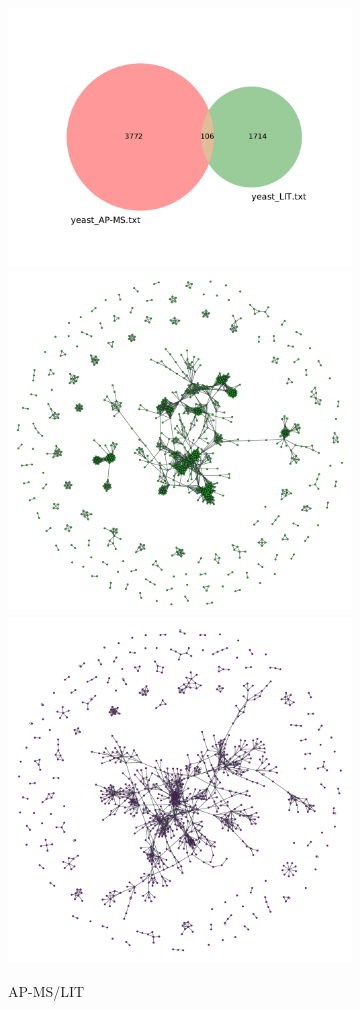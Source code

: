 \begin{figure}[!ht]
    \centering
    \begin{subfigure}[b]{0.3\columnwidth}
        \centering
        \includegraphics[width=.7\textwidth]{./schemes/venn2_coherence_yeast_AP-MS-yeast_LIT.pdf}\\
        \includegraphics[width=.45\textwidth]{./schemes/subgrafo_APMS_ap_ms_lit-gml.pdf}
        \includegraphics[width=.45\textwidth]{./schemes/subgrafo_LIT_ap_ms_lit-gml.pdf}
        \caption{\label{fig:apms-lit} AP-MS/LIT}
    \end{subfigure}
    \begin{subfigure}[b]{0.3\columnwidth}
        \centering

\end{subfigure}
\end{figure}
